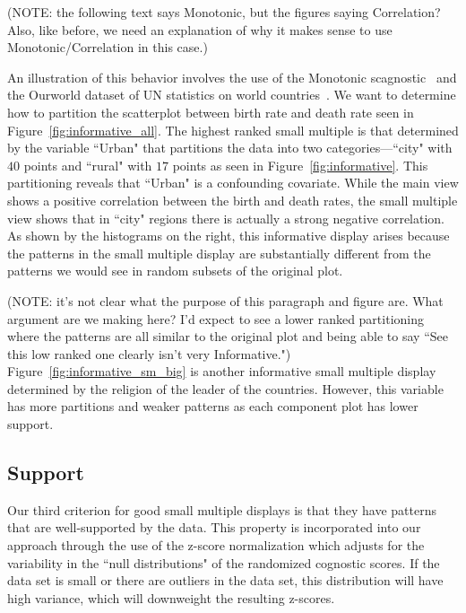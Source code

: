 (NOTE: the following text says Monotonic, but the figures saying Correlation? Also, like before, we need an explanation of why it makes sense to use Monotonic/Correlation in this case.)

An illustration of this behavior involves the use of the Monotonic scagnostic~\cite{Wilkinson2005} and the Ourworld dataset of UN statistics on world countries~\cite{Wilkinson2005GG}. We want to determine how to partition the scatterplot between birth rate and death rate seen in Figure~\ref{fig:informative_all}. The highest ranked small multiple is that determined by the variable ``Urban" that partitions the data into two categories---``city" with $40$ points and ``rural" with $17$ points as seen in Figure~\ref{fig:informative}. This partitioning reveals that ``Urban" is a confounding covariate. While the main view shows a positive correlation between the birth and death rates, the small multiple view shows that in ``city" regions there is actually a strong negative correlation. As shown by the histograms on the right, this informative display arises because the patterns in the small multiple display are substantially different from the patterns we would see in random subsets of the original plot.


(NOTE: it's not clear what the purpose of this paragraph and figure are. What argument are we making here? I'd expect to see a lower ranked partitioning where the patterns are all similar to the original plot and being able to say ``See this low ranked one clearly isn't very Informative.")
Figure~\ref{fig:informative_sm_big} is another informative small multiple display determined by the religion of the leader of the countries. However, this variable has more partitions and weaker patterns as each component plot has lower support. 


\subsection{Support}
Our third criterion for good small multiple displays is that they have patterns that are well-supported by the data. This property is incorporated into our approach through the use of the z-score normalization which adjusts for the variability in the ``null distributions" of the randomized cognostic scores. If the data set is small or there are outliers in the data set, this distribution will have high variance, which will downweight the resulting z-scores.

